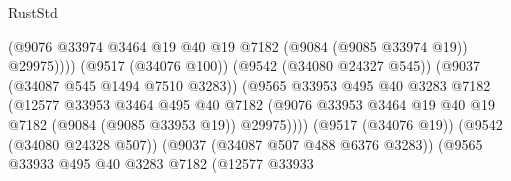 \begin{lexlean}{RustStd}
\begin{coremodule}
                                                    (@9076
                                                      @33974
                                                      @3464
                                                      @19
                                                      @40
                                                      @19
                                                      @7182
                                                      (@9084 (@9085 @33974 @19))
                                                      @29975))))
                                              (@9517 (@34076 @100))
                                              (@9542 (@34080 @24327 @545))
                                              (@9037 (@34087 @545 @1494 @7510 @3283))
                                              (@9565
                                                @33953
                                                @495
                                                @40
                                                @3283
                                                @7182
                                                (@12577
                                                  @33953
                                                  @3464
                                                  @495
                                                  @40
                                                  @7182
                                                  (@9076
                                                    @33953
                                                    @3464
                                                    @19
                                                    @40
                                                    @19
                                                    @7182
                                                    (@9084 (@9085 @33953 @19))
                                                    @29975))))
                                            (@9517 (@34076 @19))
                                            (@9542 (@34080 @24328 @507))
                                            (@9037 (@34087 @507 @488 @6376 @3283))
                                            (@9565
                                              @33933
                                              @495
                                              @40
                                              @3283
                                              @7182
                                              (@12577
                                                @33933

\end{coremodule}
\end{lexlean}
